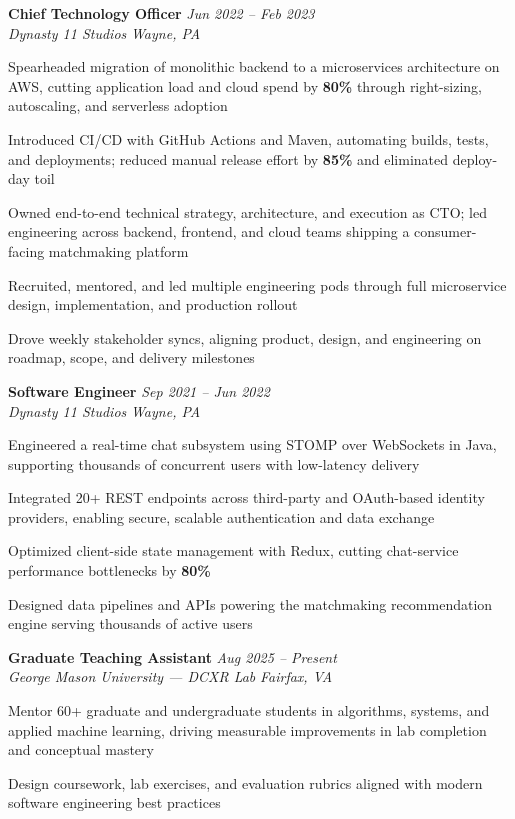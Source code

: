 \documentclass[letterpaper,10pt]{article}
\newcommand{\role}[4]{%
  \textbf{#1} \hfill \textit{#3}\\[-1pt]
  \textit{#2} \hfill \textit{#4}\par\vspace{2pt}
}
\begin{document}
\role{Chief Technology Officer}{Dynasty 11 Studios}{Jun 2022 -- Feb 2023}{Wayne, PA}
\begin{tightitemize}
  \item Spearheaded migration of monolithic backend to a microservices architecture on AWS, cutting application load and cloud spend by \textbf{80\%} through right-sizing, autoscaling, and serverless adoption
  \item Introduced CI/CD with GitHub Actions and Maven, automating builds, tests, and deployments; reduced manual release effort by \textbf{85\%} and eliminated deploy-day toil
  \item Owned end-to-end technical strategy, architecture, and execution as CTO; led engineering across backend, frontend, and cloud teams shipping a consumer-facing matchmaking platform
  \item Recruited, mentored, and led multiple engineering pods through full microservice design, implementation, and production rollout
  \item Drove weekly stakeholder syncs, aligning product, design, and engineering on roadmap, scope, and delivery milestones
\end{tightitemize}

\role{Software Engineer}{Dynasty 11 Studios}{Sep 2021 -- Jun 2022}{Wayne, PA}
\begin{tightitemize}
  \item Engineered a real-time chat subsystem using STOMP over WebSockets in Java, supporting thousands of concurrent users with low-latency delivery
  \item Integrated 20+ REST endpoints across third-party and OAuth-based identity providers, enabling secure, scalable authentication and data exchange
  \item Optimized client-side state management with Redux, cutting chat-service performance bottlenecks by \textbf{80\%}
  \item Designed data pipelines and APIs powering the matchmaking recommendation engine serving thousands of active users
\end{tightitemize}

\role{Graduate Teaching Assistant}{George Mason University --- DCXR Lab}{Aug 2025 -- Present}{Fairfax, VA}
\begin{tightitemize}
  \item Mentor 60+ graduate and undergraduate students in algorithms, systems, and applied machine learning, driving measurable improvements in lab completion and conceptual mastery
  \item Design coursework, lab exercises, and evaluation rubrics aligned with modern software engineering best practices
\end{tightitemize}
\end{document}
